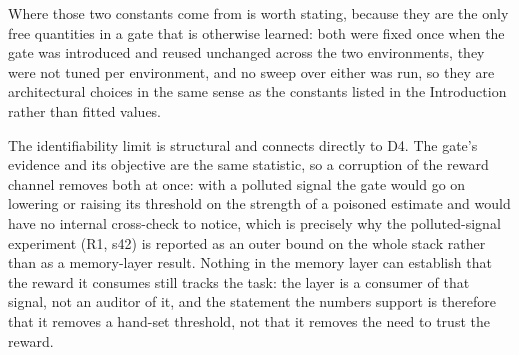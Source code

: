 \documentclass[preprint,12pt]{elsarticle}
\begin{document}
Where those two constants come from
is worth stating, because they are the only free quantities in a gate that is
otherwise learned: both were fixed once when the gate was introduced and
reused unchanged across the two environments, they were not tuned per
environment, and no sweep over either was run, so they are architectural
choices in the same sense as the constants listed in the Introduction rather
than fitted values.

The identifiability limit is structural and connects
directly to D4. The gate's evidence and its objective are the same statistic,
so a corruption of the reward channel removes both at once: with a polluted
signal the gate would go on lowering or raising its threshold on the strength
of a poisoned estimate and would have no internal cross-check to notice, which
is precisely why the polluted-signal experiment (R1, s42) is reported as an
outer bound on the whole stack rather than as a memory-layer result. Nothing in
the memory layer can establish that the reward it consumes still tracks the
task: the layer is a consumer of that signal, not an auditor of it, and
the statement the numbers support is therefore that it removes a
hand-set threshold, not that it removes the need to trust the reward.
\end{document}
